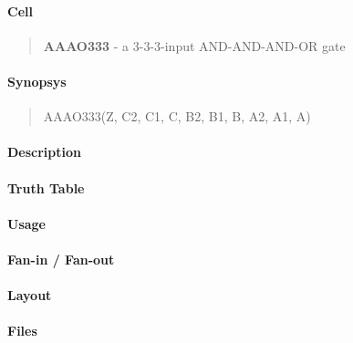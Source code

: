 \label{AAAO333}
\paragraph{Cell}
\begin{quote}
    \textbf{AAAO333} - a 3-3-3-input AND-AND-AND-OR gate
\end{quote}

\paragraph{Synopsys}
\begin{quote}
    AAAO333(Z, C2, C1, C, B2, B1, B, A2, A1, A)
\end{quote}

\paragraph{Description}

%

\paragraph{Truth Table}
%

\paragraph{Usage}

\paragraph{Fan-in / Fan-out}

\paragraph{Layout}

\paragraph{Files}
